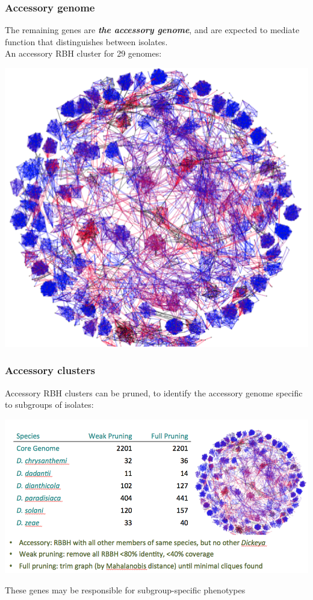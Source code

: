 \begin{frame}
  \frametitle{Accessory genome}
  \textcolor{hutton_green}{The remaining genes are \textbf{\textit{the accessory genome}}, and are expected to mediate function that distinguishes between isolates.}\\[0.2cm]
  An accessory RBH cluster for 29 genomes:
  \begin{center}
      \includegraphics[height=0.5\textheight]{images/accessory_cluster} 
  \end{center}
\end{frame}

\begin{frame}
  \frametitle{Accessory clusters}
  Accessory RBH clusters can be pruned, to identify the accessory genome specific to subgroups of isolates:
  \begin{center}
      \includegraphics[height=0.55\textheight]{images/dickeya_accessory} 
  \end{center}
  \textcolor{hutton_green}{These genes may be responsible for subgroup-specific phenotypes}
\end{frame}

